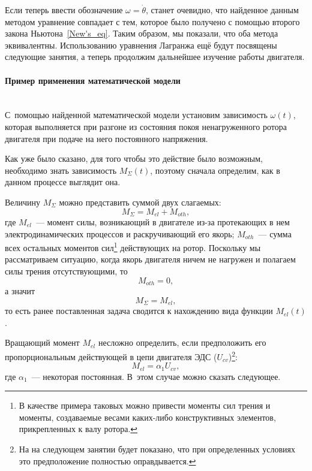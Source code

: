 \documentclass[12pt,a4paper,openany]{extarticle}
\begin{document}
Если теперь ввести обозначение $\omega = \dot\theta$, станет очевидно, что найденное данным методом уравнение совпадает с тем, которое было  получено с помощью второго закона Ньютона~\eqref{New's_eq}. 
Таким образом, мы показали, что оба метода эквивалентны. 
Использованию уравнения Лагранжа ещё будут посвящены следующие занятия, а теперь продолжим дальнейшее изучение работы двигателя.
 
\paragraph*{Пример применения математической модели}$\phantom{-}$\\
\hspace*{\parindent}С~помощью найденной математической модели установим зависимость $\omega(t)$, которая выполняется при разгоне из состояния покоя ненагруженного ротора двигателя при подаче на него постоянного напряжения.

Как уже было сказано, для того чтобы это действие было возможным, необходимо знать зависимость $M_\varSigma(t)$, поэтому сначала определим, как в данном процессе выглядит она.

Величину $M_\varSigma$ можно представить суммой двух слагаемых:
\begin{equation}
	M_\varSigma = M_{el} + M_{oth},
\end{equation}
где $M_{el}$~--- момент силы, возникающий в двигателе из-за протекающих в нем электродинамических процессов и раскручивающий его якорь; $M_{oth}$~--- сумма всех остальных моментов сил\lefteqn{,}\footnote{В качестве примера таковых можно привести моменты сил трения и моменты, создаваемые весами каких-либо конструктивных элементов, прикрепленных к валу ротора.} действующих на ротор.
Поскольку мы рассматриваем ситуацию, когда якорь двигателя ничем не нагружен и полагаем силы трения отсутствующими, то 
\begin{equation}
	M_{oth} = 0,
\end{equation} 
а значит 
\begin{equation}
	M_\varSigma = M_{el},
\end{equation}
то есть ранее поставленная задача сводится к нахождению вида функции $M_{el}(t)$.

Вращающий момент $M_{el}$ несложно определить, если предположить его пропорциональным действующей в цепи двигателя ЭДС ($U_{cv}$)\footnote{На на следующем занятии будет показано, что при определенных условиях это предположение полностью оправдывается.}:
\begin{equation}\label{connect_M_U}
	M_{el} = \alpha_1U_{cv},
\end{equation}
где $\alpha_1$~--- некоторая постоянная.
В~этом случае можно сказать следующее.
  
\end{document}
